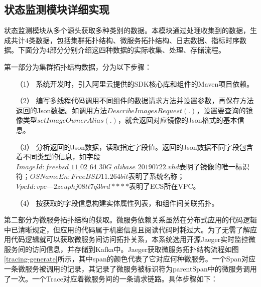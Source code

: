 \subsection{状态监测模块详细实现}\label{data-collect-way}
状态监测模块从多个源头获取多种类别的数据。本模块通过处理收集到的数据，生成共计4类数据，包括集群拓扑结构、微服务拓扑结构、日志数据、指标时序数据。下面分为4部分分别介绍这四种数据的实际收集、处理、存储流程。

第一部分为集群拓扑结构数据，分为以下步骤：
\begin{itemize}
    \item [（1）]系统开发时，引入阿里云提供的SDK核心库和组件的Maven项目依赖。
    \item [（2）]编写多线程代码调用不同组件的数据请求方法并设置参数，再保存方法返回的Json数据。如调用方法$DescribeImagesRequest(.)$，设置要查询的镜像类型$setImageOwnerAlias(.)$，就会返回对应镜像的Json格式的基本信息。
    \item [（3）]分析返回的Json数据，读取指定字段值。返回的Json数据不同字段包含着不同类型的信息，如字段$ ImageId: freebsd\_11\_02\_64\_30G\_alibase\_20190722.vhd$表明了镜像的唯一标识符；$OSNameEn: FreeBSD  11.2 64 bit$表明了系统名称；$VpcId:vpc—2zeuphj08tt7q3brd****$表明了ECS所在VPC。
    \item [（4）]按获取的字段信息构建实体属性列表，和组件间关联拓扑。
\end{itemize}

第二部分为微服务拓扑结构的获取。微服务依赖关系虽然在分布式应用的代码逻辑中已清晰规定，但应用的代码属于机密信息且阅读代码时耗过大。为了无需了解应用代码逻辑就可以获取微服务间访问拓扑关系，本系统选用开源Jaeger实时监控微服务间的访问信息，并存储到Kafka中。Jaeger获取微服务拓扑结构流程如图\ref{tracing-generate}所示，其中span的颜色代表了它对应何种微服务。一个Span对应一条微服务被调用的记录，其记录了微服务被标识符为parentSpan中的微服务调用了一次。一个Trace对应着微服务间的一条请求链路。具体步骤如下：

